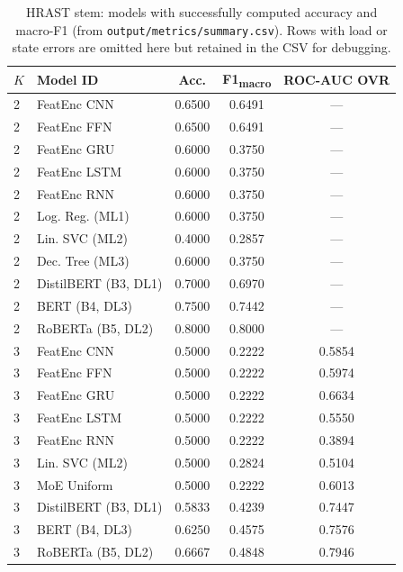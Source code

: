 \begin{table}[H]
\centering
\caption{HRAST stem: models with successfully computed accuracy and macro-F1 (from \texttt{output/metrics/summary.csv}). Rows with load or state errors are omitted here but retained in the CSV for debugging.}
\label{tab:hrast_summary}
{\small
\begin{tabular}{@{}l l c c c@{}}
\toprule
$K$ & Model ID & Acc. & F1\textsubscript{macro} & ROC-AUC OVR \\
\midrule
2 & FeatEnc CNN & 0.6500 & 0.6491 & --- \\
2 & FeatEnc FFN & 0.6500 & 0.6491 & --- \\
2 & FeatEnc GRU & 0.6000 & 0.3750 & --- \\
2 & FeatEnc LSTM & 0.6000 & 0.3750 & --- \\
2 & FeatEnc RNN & 0.6000 & 0.3750 & --- \\
2 & Log. Reg. (ML1) & 0.6000 & 0.3750 & --- \\
2 & Lin. SVC (ML2) & 0.4000 & 0.2857 & --- \\
2 & Dec. Tree (ML3) & 0.6000 & 0.3750 & --- \\
2 & DistilBERT (B3, DL1) & 0.7000 & 0.6970 & --- \\
2 & BERT (B4, DL3) & 0.7500 & 0.7442 & --- \\
2 & RoBERTa (B5, DL2) & 0.8000 & 0.8000 & --- \\
\midrule
3 & FeatEnc CNN & 0.5000 & 0.2222 & 0.5854 \\
3 & FeatEnc FFN & 0.5000 & 0.2222 & 0.5974 \\
3 & FeatEnc GRU & 0.5000 & 0.2222 & 0.6634 \\
3 & FeatEnc LSTM & 0.5000 & 0.2222 & 0.5550 \\
3 & FeatEnc RNN & 0.5000 & 0.2222 & 0.3894 \\
3 & Lin. SVC (ML2) & 0.5000 & 0.2824 & 0.5104 \\
3 & MoE Uniform & 0.5000 & 0.2222 & 0.6013 \\
3 & DistilBERT (B3, DL1) & 0.5833 & 0.4239 & 0.7447 \\
3 & BERT (B4, DL3) & 0.6250 & 0.4575 & 0.7576 \\
3 & RoBERTa (B5, DL2) & 0.6667 & 0.4848 & 0.7946 \\
\bottomrule
\end{tabular}
}
\end{table}
